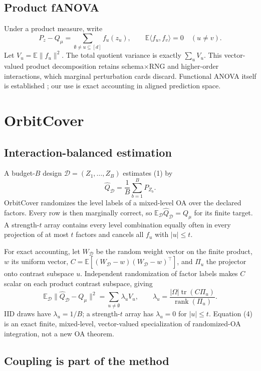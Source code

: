 \documentclass{article}
\newcommand{\E}{\mathbb{E}}
\newcommand{\Qhat}{\widehat{Q}}
\begin{document}
\subsection{Product fANOVA}

Under a product measure, write
\[
 P_z-Q_\mu=\sum_{\emptyset\ne u\subseteq[d]}f_u(z_u),\qquad
 \E\langle f_u,f_v\rangle=0\quad(u\ne v). \tag{3}
\]
Let $V_u=\E\lVert f_u\rVert^2$. The total quotient variance is exactly
$\sum_u V_u$. This vector-valued product decomposition retains
schema$\times$RNG and higher-order interactions, which marginal perturbation
cards discard. Functional ANOVA itself is established
\citep{lengerich2020fanova}; our use is exact accounting in aligned prediction
space.

\section{OrbitCover}
\label{sec:method}

\subsection{Interaction-balanced estimation}

A budget-$B$ design $\mathcal{D}=(Z_1,\ldots,Z_B)$ estimates (1) by
\[
 \Qhat_{\mathcal D}=\frac1B\sum_{b=1}^{B}P_{Z_b}.
\]
OrbitCover randomizes the level labels of a mixed-level OA over the declared
factors. Every row is then marginally correct, so
$\E_{\mathcal D}\Qhat_{\mathcal D}=Q_\mu$ for its finite target. A
strength-$t$ array contains every level combination equally often in every
projection of at most $t$ factors and cancels all $f_u$ with $|u|\leq t$.

For exact accounting, let $W_{\mathcal D}$ be the random weight vector on the
finite product, $w$ its uniform vector,
$C=\E[(W_{\mathcal D}-w)(W_{\mathcal D}-w)^\top]$, and $\Pi_u$ the projector
onto contrast subspace $u$. Independent randomization of factor labels makes
$C$ scalar on each product contrast subspace, giving
\[
 \E_{\mathcal D}\lVert\Qhat_{\mathcal D}-Q_\mu\rVert^2
 =\sum_{u\ne\emptyset}\lambda_uV_u,\qquad
 \lambda_u=\frac{|\Omega|\operatorname{tr}(C\Pi_u)}
                  {\operatorname{rank}(\Pi_u)}. \tag{4}
\]
IID draws have $\lambda_u=1/B$; a strength-$t$ array has $\lambda_u=0$ for
$|u|\leq t$. Equation (4) is an exact finite, mixed-level, vector-valued
specialization of randomized-OA integration, not a new OA theorem.

\subsection{Coupling is part of the method}
\end{document}
